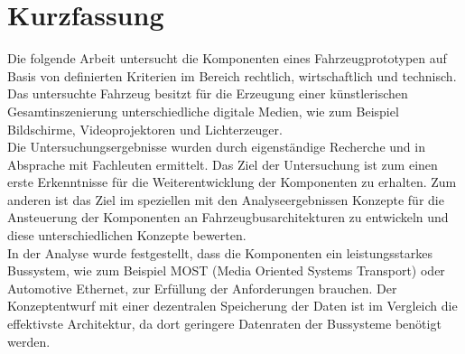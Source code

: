 \chapter*{Kurzfassung} %
Die folgende Arbeit untersucht die Komponenten eines Fahrzeugprototypen auf Basis von definierten Kriterien im Bereich rechtlich, wirtschaftlich und technisch. Das untersuchte Fahrzeug besitzt für die Erzeugung einer künstlerischen Gesamtinszenierung unterschiedliche digitale Medien, wie zum Beispiel Bildschirme, Videoprojektoren und Lichterzeuger. \\
Die Untersuchungsergebnisse wurden durch eigenständige Recherche und in Absprache mit Fachleuten ermittelt. Das Ziel der Untersuchung ist zum einen erste Erkenntnisse für die Weiterentwicklung der Komponenten zu erhalten. Zum anderen ist das Ziel im speziellen mit den Analyseergebnissen Konzepte für die Ansteuerung der Komponenten an Fahrzeugbusarchitekturen zu entwickeln und diese unterschiedlichen Konzepte bewerten. \\
In der Analyse wurde festgestellt, dass die Komponenten ein leistungsstarkes Bussystem, wie zum Beispiel MOST (Media Oriented Systems Transport) oder Automotive Ethernet, zur Erfüllung der Anforderungen brauchen. Der Konzeptentwurf mit einer dezentralen Speicherung der Daten ist im Vergleich die effektivste Architektur, da dort geringere Datenraten der Bussysteme benötigt werden.
\cleardoublepage